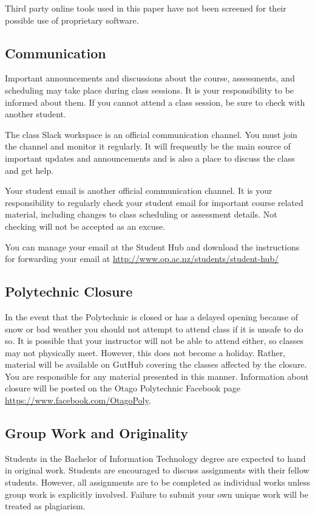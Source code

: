 \documentclass{article}
\begin{document}
Third party online tools used in this paper have not been screened for their possible use of proprietary software.

\subsection*{Communication}
Important announcements and discussions about the course, assessments, and scheduling may take place during class sessions.  It is your responsibility to be informed about them.  If you cannot attend a class session, be sure to check with another student.

The class Slack workspace is an official communication channel. You must join the channel and monitor it regularly. It will frequently be the main source of important updates and announcements and is also a place to discuss the class and get help.

Your student email is another official communication channel. It is your responsibility to regularly check your student email for important course related material, including changes to class scheduling or assessment details. Not checking will not be accepted as an excuse.

You can manage your email at the Student Hub and download the instructions for forwarding your email at \url{http://www.op.ac.nz/students/student-hub/}

\subsection*{Polytechnic Closure}
In the event that the Polytechnic is closed or has a delayed opening because of snow or bad weather you should not attempt to attend class if it is unsafe to do so. It is possible that your instructor will not be able to attend either, so classes may not physically meet. However, this does not become a holiday. Rather, material will be available on GutHub covering the classes affected by the closure. You are responsible for any material presented in this manner. Information about closure will be posted on the Otago Polytechnic Facebook page \url{https://www.facebook.com/OtagoPoly}.

\subsection*{Group Work and Originality}
Students in the Bachelor of Information Technology degree are expected to hand in original work.  
Students are encouraged to discuss assignments with their fellow students.  However, all assignments 
are to be completed as individual works unless group work is explicitly involved.
Failure to submit your own unique work will be treated as plagiarism.
\end{document}
